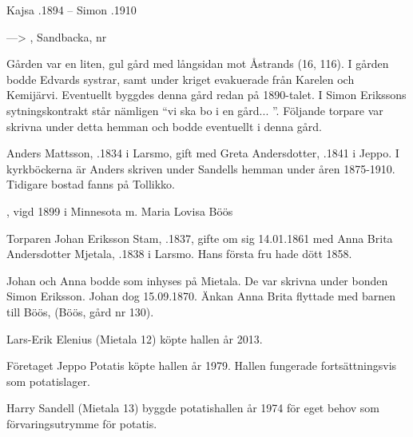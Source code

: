 Kajsa .1894  --	Simon .1910


--->	, Sandbacka, nr 

Gården var en liten, gul gård med långsidan mot Åstrands (16, 116).	I gården bodde Edvards systrar, samt under kriget evakuerade från Karelen och Kemijärvi. Eventuellt byggdes denna gård redan på 1890-talet. I Simon Erikssons sytningskontrakt står nämligen ``vi ska bo i en gård... ''. Följande torpare var skrivna under detta hemman och bodde eventuellt i denna gård.


Anders Mattsson, .1834 i Larsmo, gift med Greta Andersdotter, .1841 i Jeppo. I kyrkböckerna är Anders skriven under Sandells hemman under åren 1875-1910. Tidigare bostad fanns på Tollikko.
\begin{jhchildren}
  \item {}, vigd 1899 i  Minnesota m. Maria Lovisa Böös
  \item {}
\end{jhchildren}


Torparen Johan Eriksson Stam, .1837, gifte om sig 14.01.1861 med Anna Brita Andersdotter Mjetala,  .1838 i Larsmo. Hans första fru hade dött 1858.
\begin{jhchildren}
  \item {}
  \item {}
  \item {}
  \item {}
\end{jhchildren}
Johan och Anna bodde som inhyses på Mietala. De var skrivna under bonden Simon Eriksson. Johan dog 15.09.1870. Änkan Anna Brita flyttade med barnen till Böös, (Böös, gård nr 130).




Lars-Erik Elenius (Mietala 12) köpte hallen år 2013.


Företaget Jeppo Potatis köpte hallen år 1979. Hallen fungerade fortsättningsvis som potatislager.


Harry Sandell (Mietala 13) byggde potatishallen år 1974 för eget behov som förvaringsutrymme för potatis.



